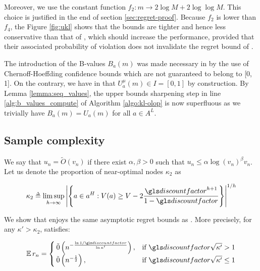 Moreover, we use the constant function $f_2: m \rightarrow 2 \log M + 2 \log\log M$. This choice is justified in the end of section \ref{sec:regret-proof}. Because $f_2$ is lower than $f_4$, the Figure \ref{fig:ukl} shows that the bounds are tighter and hence less conservative than that of \OLOP, which should increase the performance, provided that their associated probability of violation does not invalidate the regret bound of \OLOP.


\begin{remark}
	\label{rmk:sharpen}
	\begin{leftbar}[remarkbar]
	The introduction of the B-values $B_a(m)$ was made necessary in \OLOP by the use of Chernoff-Hoeffding confidence bounds which are not guaranteed to belong to [0, 1]. On the contrary, we have in \KLOLOP that $U^\mu_a(m) \in I = [0,1]$ by construction. By Lemma \ref{lemma:seq_values}, the upper bounds sharpening step in line \ref{alg:b_values_compute} of Algorithm \ref{algo:kl-olop} is now superfluous as we trivially have $B_a(m) = U_a(m)$ for all $a\in A^L$.
	\end{leftbar}
\end{remark}

\subsection{Sample complexity}
\label{sec:sample-complexity}

We say that $u_n = \tilde{O}(v_n)$ if there exist $\alpha, \beta >0$ such that $u_n \leq \alpha \log(v_n)^\beta v_n$.
Let us denote the proportion of near-optimal nodes $\kappa_2$ as


\begin{equation*}
\label{eq:kappa}
\kappa_2 \eqdef \limsup_{h\rightarrow\infty}{\left|\left\{a\in a^H:V(a) \geq V - 2\frac{\discount^{h+1}}{1-\discount}\right\}\right|^{1/h}}
\end{equation*}

\begin{theorem}
	\label{thm:regret}
	\begin{leftbar}[theorembar]
	We show that \KLOLOP enjoys the same asymptotic regret bounds as \OLOP. More precisely, for any $\kappa' > \kappa_2$, \KLOLOP satisfies:
	
	
	\begin{equation*}
	\expectedvalue r_n = \begin{cases}
	\tilde{0}\left(n^{-\frac{\log 1/\discount}{\log \kappa'}}\right), & \text{if}\ \discount\sqrt{\kappa'} > 1 \\
	\tilde{0}\left(n^{-\frac{1}{2}}\right), & \text{if}\ \discount\sqrt{\kappa'} \leq 1
	\end{cases}
	\end{equation*}
	\end{leftbar}
\end{theorem}

